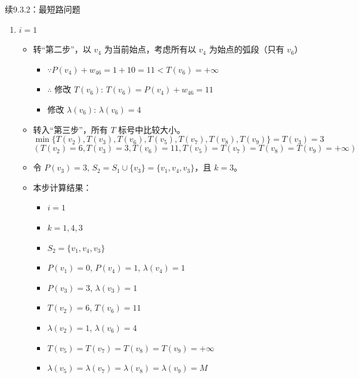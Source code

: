 \begin{exbox}{续9.3.2：最短路问题}{}
\begin{enumerate}[label=(\arabic*)]
			\item \( i = 1 \)
			\begin{itemize}
				\item 转“第二步”，以 \( v_4 \) 为当前始点，考虑所有以 \( v_4 \) 为始点的弧段（只有 \( v_6 \)）
				\begin{itemize}
					\item \(\because P(v_4) + w_{46} = 1 + 10 = 11 < T(v_6) = +\infty \)
					\item \(\therefore\) 修改 \( T(v_6) \): \( T(v_6) = P(v_4) + w_{46} = 11 \)
					\item 修改 \( \lambda(v_6) \): \( \lambda(v_6) = 4 \)
				\end{itemize}
				\item 转入“第三步”，所有 \( T \) 标号中比较大小。
				\[
				\min\{T(v_2), T(v_3), T(v_6), T(v_5), T(v_7), T(v_8), T(v_9)\} = T(v_3) = 3
				\]
				\[
				(T(v_2) = 6, T(v_3) = 3, T(v_6) = 11, T(v_5) = T(v_7) = T(v_8) = T(v_9) = +\infty)
				\]
				\item 令 \( P(v_3) = 3 \), \( S_2 = S_1 \cup \{v_3\} = \{v_1, v_4, v_3\} \)，且 \( k = 3 \)。
				\item 本步计算结果：
				\begin{itemize}
					\item \( i = 1 \)
					\item \( k = 1, 4, 3 \)
					\item \( S_2 = \{v_1, v_4, v_3\} \)
					\item \( P(v_1) = 0 \), \( P(v_4) = 1 \), \( \lambda(v_4) = 1 \)
					\item \( P(v_3) = 3 \), \( \lambda(v_3) = 1 \)
					\item \( T(v_2) = 6 \), \( T(v_6) = 11 \)
					\item \( \lambda(v_2) = 1 \), \( \lambda(v_6) = 4 \)
					\item \( T(v_5) = T(v_7) = T(v_8) = T(v_9) = +\infty \)
					\item \( \lambda(v_5) = \lambda(v_7) = \lambda(v_8) = \lambda(v_9) = M \)
				\end{itemize}
			\end{itemize}
		

\end{enumerate}
\end{exbox}
